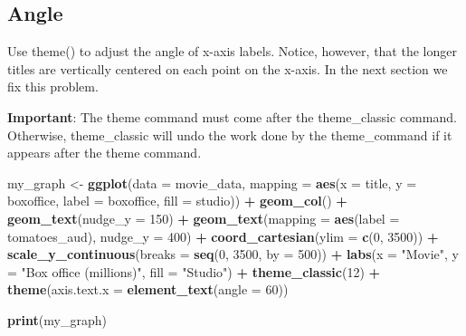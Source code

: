 \documentclass[
]{krantz}
\makeatletter
\newenvironment{Shaded}{\begin{snugshade}}{\end{snugshade}}
\newcommand{\DataTypeTok}[1]{\textcolor[rgb]{0.27,0.27,0.27}{#1}}
\newcommand{\DecValTok}[1]{\textcolor[rgb]{0.06,0.06,0.06}{#1}}
\newcommand{\KeywordTok}[1]{\textcolor[rgb]{0.27,0.27,0.27}{\textbf{#1}}}
\newcommand{\NormalTok}[1]{#1}
\newcommand{\OperatorTok}[1]{\textcolor[rgb]{0.43,0.43,0.43}{\textbf{#1}}}
\newcommand{\StringTok}[1]{\textcolor[rgb]{0.5,0.5,0.5}{#1}}
\newenvironment{kframe}{%
\medskip{}
\setlength{\fboxsep}{.8em}
 \def\at@end@of@kframe{}%
 \ifinner\ifhmode%
  \def\at@end@of@kframe{\end{minipage}}%
  \begin{minipage}{\columnwidth}%
 \fi\fi%
 \def\FrameCommand##1{\hskip\@totalleftmargin \hskip-\fboxsep
 \colorbox{shadecolor}{##1}\hskip-\fboxsep
     \hskip-\linewidth \hskip-\@totalleftmargin \hskip\columnwidth}%
 \MakeFramed {\advance\hsize-\width
   \@totalleftmargin\z@ \linewidth\hsize
   \@setminipage}}%
 {\par\unskip\endMakeFramed%
 \at@end@of@kframe}
\renewenvironment{Shaded}{\begin{kframe}}{\end{kframe}}
\makeatother
\begin{document}
\hypertarget{angle}{%
\subsection{Angle}\label{angle}}

Use theme() to adjust the angle of x-axis labels. Notice, however, that the longer titles are vertically centered on each point on the x-axis. In the next section we fix this problem.

\textbf{Important}: The theme command must come after the theme\_classic command. Otherwise, theme\_classic will undo the work done by the theme\_command if it appears after the theme command.

\begin{Shaded}
\begin{Highlighting}[]
\NormalTok{my_graph <-}\StringTok{ }\KeywordTok{ggplot}\NormalTok{(}\DataTypeTok{data =}\NormalTok{ movie_data,}
           \DataTypeTok{mapping =} \KeywordTok{aes}\NormalTok{(}\DataTypeTok{x =}\NormalTok{ title,}
                         \DataTypeTok{y =}\NormalTok{ boxoffice,}
                         \DataTypeTok{label =}\NormalTok{ boxoffice, }
                         \DataTypeTok{fill =}\NormalTok{ studio)) }\OperatorTok{+}
\StringTok{  }\KeywordTok{geom_col}\NormalTok{() }\OperatorTok{+}
\StringTok{  }\KeywordTok{geom_text}\NormalTok{(}\DataTypeTok{nudge_y =} \DecValTok{150}\NormalTok{)  }\OperatorTok{+}
\StringTok{  }\KeywordTok{geom_text}\NormalTok{(}\DataTypeTok{mapping =} \KeywordTok{aes}\NormalTok{(}\DataTypeTok{label =}\NormalTok{ tomatoes_aud), }
            \DataTypeTok{nudge_y =} \DecValTok{400}\NormalTok{) }\OperatorTok{+}
\StringTok{  }\KeywordTok{coord_cartesian}\NormalTok{(}\DataTypeTok{ylim =} \KeywordTok{c}\NormalTok{(}\DecValTok{0}\NormalTok{, }\DecValTok{3500}\NormalTok{)) }\OperatorTok{+}
\StringTok{  }\KeywordTok{scale_y_continuous}\NormalTok{(}\DataTypeTok{breaks =} \KeywordTok{seq}\NormalTok{(}\DecValTok{0}\NormalTok{, }\DecValTok{3500}\NormalTok{, }\DataTypeTok{by =} \DecValTok{500}\NormalTok{)) }\OperatorTok{+}
\StringTok{  }\KeywordTok{labs}\NormalTok{(}\DataTypeTok{x =} \StringTok{"Movie"}\NormalTok{,}
       \DataTypeTok{y =} \StringTok{"Box office (millions)"}\NormalTok{,}
       \DataTypeTok{fill =} \StringTok{"Studio"}\NormalTok{) }\OperatorTok{+}
\StringTok{  }\KeywordTok{theme_classic}\NormalTok{(}\DecValTok{12}\NormalTok{) }\OperatorTok{+}
\StringTok{  }\KeywordTok{theme}\NormalTok{(}\DataTypeTok{axis.text.x =} \KeywordTok{element_text}\NormalTok{(}\DataTypeTok{angle =} \DecValTok{60}\NormalTok{))}

\KeywordTok{print}\NormalTok{(my_graph)}
\end{Highlighting}
\end{Shaded}
\end{document}
